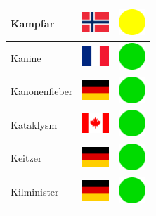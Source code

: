 \documentclass[12pt, a4paper, twoside]{report}
\begin{document}
\begin{center}
\begin{longtable}{|p{5cm}|p{2cm}|p{2cm}|}
Kampfar & \includegraphics[width=1cm]{4x3/no} & \includegraphics[width=1cm]{likes/m} \\ \hline
Kanine & \includegraphics[width=1cm]{4x3/fr} & \includegraphics[width=1cm]{likes/y} \\ \hline
Kanonenfieber & \includegraphics[width=1cm]{4x3/de} & \includegraphics[width=1cm]{likes/y} \\ \hline
Kataklysm & \includegraphics[width=1cm]{4x3/ca} & \includegraphics[width=1cm]{likes/y} \\ \hline
Keitzer & \includegraphics[width=1cm]{4x3/de} & \includegraphics[width=1cm]{likes/y} \\ \hline
Kilminister & \includegraphics[width=1cm]{4x3/de} & \includegraphics[width=1cm]{likes/y} \\ \hline

\end{longtable}
\end{center}
\end{document}
